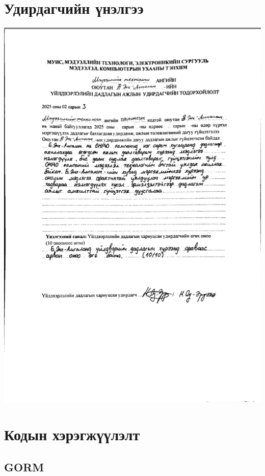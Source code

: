 
\appendix
{}

\chapter{Удирдагчийн үнэлгээ}
\includegraphics[width=14cm]{images/review.png}
\chapter{Кодын хэрэгжүүлэлт}

\section{GORM}

